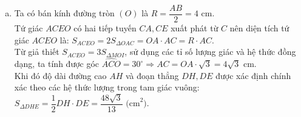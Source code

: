\begin{bt}
{\begin{enumerate}[a)]
	\item Ta có bán kính đường tròn $(O)$ là $R = \dfrac{AB}{2} = 4\text{ cm}$.\\
	Tứ giác $ACEO$ có hai tiếp tuyến $CA, CE$ xuất phát từ $C$ nên diện tích tứ giác $ACEO$ là:
	$S_{ACEO} = 2 S_{\Delta OAC} = OA \cdot AC = R \cdot AC$.\\
	Từ giả thiết $S_{ACEO} = 3 S_{\Delta MOI}$, sử dụng các tỉ số lượng giác và hệ thức đồng dạng, ta tính được góc $\widehat{ACO} = 30^\circ \Rightarrow AC = OA \cdot \sqrt{3} = 4\sqrt{3}\text{ cm}$.\\
	Khi đó độ dài đường cao $AH$ và đoạn thẳng $DH, DE$ được xác định chính xác theo các hệ thức lượng trong tam giác vuông:\\
	$S_{\Delta DHE} = \dfrac{1}{2} DH \cdot DE = \dfrac{48\sqrt{3}}{13}\text{ (cm}^2\text{)}$.
\end{enumerate}
}
\end{bt}

